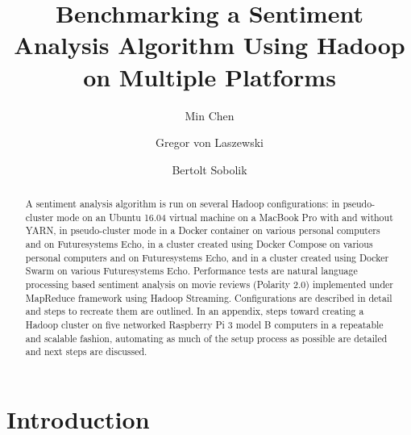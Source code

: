 \title{Benchmarking a Sentiment Analysis Algorithm Using Hadoop on Multiple 
Platforms}


\author{Min Chen}

\author{Gregor von Laszewski}

\author{Bertolt Sobolik}


\renewcommand{\shortauthors}{M. Chen, G. v. Laszewski, B. Sobolik}


\begin{abstract}
A sentiment analysis algorithm is run on several Hadoop
configurations: in pseudo-cluster mode on an Ubuntu 16.04 virtual
machine on a MacBook Pro with and without YARN, in pseudo-cluster mode
in a Docker container on various personal computers and on
Futuresystems Echo, in a cluster created using Docker Compose on
various personal computers and on Futuresystems Echo, and in a cluster
created using Docker Swarm on various Futuresystems Echo. Performance
tests are natural language processing based sentiment analysis on
movie reviews (Polarity 2.0) implemented under MapReduce framework
using Hadoop Streaming. Configurations are described in detail and
steps to recreate them are outlined. In an appendix, steps toward
creating a Hadoop cluster on five networked Raspberry Pi 3 model B
computers in a repeatable and scalable fashion, automating as much of
the setup process as possible are detailed and next steps are
discussed.
\end{abstract}



\maketitle

\section{Introduction}\label{s:intro}



